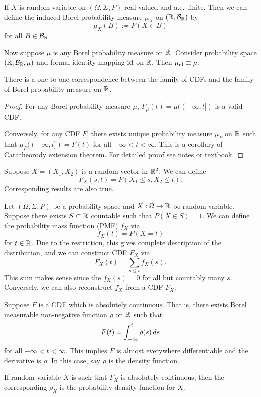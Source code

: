 \documentclass[a4paper]{article}
\begin{document}
\begin{defi}
  If $X$ is random variable on $(\Omega, \Sigma, P)$ real valued and a.e.\ finite.
  Then we can define the induced Borel probability measure
  $\mu_X$ on $(\mathbb{R}, \mathcal{B}_{\mathbb{R}})$ by
  \[
  \mu_X (B) := P \left( X \in B \right)
  \]
  for all $B \in \mathcal{B}_{\mathbb{R}}$.
\end{defi}

Now suppose $\mu$ is any Borel probability measure on $\mathbb{R}$. Consider
probability space $(\mathbb{R}, \mathcal{B}_{\mathbb{R}}, \mu)$ and formal identity mapping
$\operatorname{id}$ on $\mathbb{R}$. Then $\mu_{\operatorname{id}} \equiv \mu$.

\begin{thm}
  There is a one-to-one correspondence between the family of CDFs
  and the family of Borel probability measure on $\mathbb{R}$.
\end{thm}

\begin{proof}
  For any Borel probability measure $\mu$,
  $F_\mu (t) = \mu((-\infty, t])$
  is a valid CDF.

  Conversely, for any CDF $F$, there exists unique probability
  measure $\mu_F$ on $\mathbb{R}$ such that $\mu_F ((-\infty, t]) = F(t)$
  for all $-\infty < t < \infty$. This is a corollary of Caratheorody
  extension theorem. For detailed proof see notes or textbook.

\end{proof}

\begin{remark}
  Suppose $X = (X_1, X_2)$ is a random vector in $\mathbb{R}^2$. We can
  define
  \[
  F_X (s, t) = P \left( X_1 \leq s, X_2 \leq t \right).
  \]
  Corresponding results are also true.
\end{remark}

\begin{defi}
  Let $(\Omega, \Sigma, P)$ be a probability space and $X: \Omega
  \to \mathbb{R}$ be random variable. Suppose there exists $S \subset \mathbb{R}$ countable
  such that $P \left( X \in S \right) = 1$. We can define
  the probability mass function (PMF) $f_X$ via
  \[
  f_X (t) = P \left( X = t \right)
  \]
  for $t \in \mathbb{R}$. Due to the restriction, this gives complete description
  of the distribution, and we can construct CDF $F_X$ via
  \[
  F_X (t) = \sum_{s \leq t} f_X (s).
  \]
  This sum makes sense since the $f_X (s) = 0$ for all but countably many
  $s$.
  Conversely, we can also reconstruct $f_X$ from a CDF $F_X$.
\end{defi}

\begin{defi}
  Suppose $F$ is a CDF which is absolutely continuous. That is,
  there exists Borel measurable non-negative function $\rho$ on $\mathbb{R}$
  such that
  \[
  F(t) = \int_{-\infty}^t \rho (s) \, d s
  \]
  for all $-\infty < t < \infty$.
  This implies $F$ is almost everywhere differentiable and the derivative
  is $\rho$. In this case, say $\rho$ is the density function.

  If random variable $X$ is such that $F_X$ is absolutely continuous, then the
  corresponding $\rho_X$ is the probability density function for $X$.
\end{defi}
\end{document}
